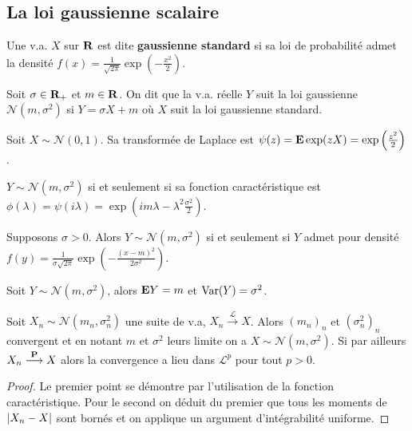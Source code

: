 \subsection{La loi gaussienne scalaire}

	\begin{defn}
		Une v.a. $X$ sur $\mathbf{R}$ est dite \textbf{gaussienne standard} si sa loi de probabilité admet la densité $f(x) = \frac{1}{\sqrt{2 \pi}} \exp \left( - \frac{x^2}{2} \right)$.
	\end{defn}
	
	\begin{defn}
		Soit $\sigma \in \mathbf{R}_+$ et $m \in \mathbf{R}$.
		On dit que la v.a. réelle $Y$ suit la loi gaussienne $\mathcal{N}(m,\sigma^2)$ si $Y = \sigma X + m$ où $X$ suit la loi gaussienne standard.
	\end{defn}
	
	\begin{pop}
		Soit $X \sim \mathcal{N}(0,1)$.
		Sa transformée de Laplace est $\psi(z) = \mathbf{E} \exp(zX) = \exp \left( \frac{z^2}{2} \right)$.
	\end{pop}
	
	\begin{pop}
		$Y \sim \mathcal{N}(m,\sigma^2)$ si et seulement si sa fonction caractéristique est $\phi(\lambda) = \psi(i \lambda) = \exp \left( im \lambda - \lambda^2 \frac{\sigma^2}{2} \right)$.
	\end{pop}
	
	\begin{pop}
		Supposons $\sigma > 0$.
		Alors $Y \sim \mathcal{N}(m,\sigma^2)$ si et seulement si $Y$ admet pour densité $f(y) = \frac{1}{\sigma \sqrt{2 \pi}} \exp \left( - \frac{(x - m)^2}{2 \sigma^2} \right)$.
	\end{pop}
	
	\begin{pop}
		Soit $Y \sim \mathcal{N}(m,\sigma^2)$, alors $\mathbf{E} Y = m$ et $\operatorname{Var}(Y) = \sigma^2$.
	\end{pop}
	
	\begin{pop}
		Soit $X_n \sim \mathcal{N}(m_n, \sigma_n^2)$ une suite de v.a, $X_n \overset{\mathcal{L}}{\longrightarrow} X$.
		Alors $(m_n)_n$ et $(\sigma_n^2)_n$ convergent et en notant $m$ et $\sigma^2$ leurs limite on a $X \sim \mathcal{N}(m,\sigma^2)$.
		Si par ailleurs $X_n \overset{\mathbf{P}}{\longrightarrow} X$ alors la convergence a lieu dans $\mathcal{L}^p$ pour tout $p > 0$.
	\end{pop}
	
	\begin{proof}
		Le premier point se démontre par l'utilisation de la fonction caractéristique.
		Pour le second on déduit du premier que tous les moments de $\left\lvert X_n - X\right\rvert$ sont bornés et on applique un argument d'intégrabilité uniforme.
	\end{proof}




